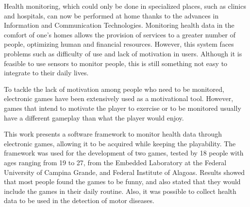 Health monitoring, which could only be done in specialized places, such as clinics and hospitals, can now be performed at home thanks to the advances in Information and Communication Technologies. Monitoring health data in the comfort of one's homes allows the provision of services to a greater number of people, optimizing human and financial resources. However, this system faces problems such as difficulty of use and lack of motivation in users. Although it is feasible to use sensors to monitor people, this is still something not easy to integrate to their daily lives. 

To tackle the lack of motivation among people who need to be monitored, electronic games have been extensively used as a motivational tool. However, games that intend to motivate the player to exercise or to be monitored usually have a different gameplay than what the player would enjoy.

This work presents a software framework to monitor health data through electronic games, allowing it to be acquired while keeping the playability. The framework was used for the development of two games, tested by 18 people with ages ranging from 19 to 27, from the Embedded Laboratory at the Federal University of Campina Grande, and Federal Institute of Alagoas. Results showed that most people found the games to be funny, and also stated that they would include the games in their daily routine. Also, it was possible to collect health data to be used in the detection of motor diseases.
